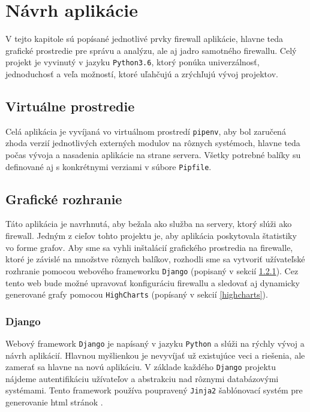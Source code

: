\chapter{Návrh aplikácie}
\label{app-design}

	V tejto kapitole sú popísané jednotlivé prvky firewall aplikácie, hlavne teda grafické prostredie 
	pre správu a analýzu, ale aj jadro samotného firewallu. Celý projekt je vyvinutý v jazyku \texttt{Python3.6},
	ktorý ponúka univerzálnosť, jednoduchosť a veľa možností, ktoré uľahčujú a zrýchľujú vývoj projektov.

	\section{Virtuálne prostredie}
	\label{pipenv}
		Celá aplikácia je vyvíjaná vo virtuálnom prostredí \texttt{pipenv}, aby bol zaručená zhoda verzií 
		jednotlivých externých modulov na rôznych systémoch, hlavne teda počas vývoja a nasadenia aplikácie
		na strane servera. Všetky potrebné balíky su definované aj s konkrétnymi verziami v súbore \texttt{Pipfile}.

	\section{Grafické rozhranie}
	\label{gui}
		Táto aplikácia je navrhnutá, aby bežala ako služba na servery, ktorý slúži ako firewall. Jedným
		z cieľov tohto projektu je, aby aplikácia poskytovala štatistiky vo forme grafov. Aby sme sa vyhli
		inštalácií grafického prostredia na firewalle, ktoré je závislé na množstve rôznych balíkov, rozhodli
		sme sa vytvoriť užívateľské rozhranie pomocou webového frameworku \texttt{Django} (popisaný v sekcií
		\ref{django}). Cez tento web bude možné upravovať konfiguráciu firewallu a sledovať aj dynamicky 
		generované grafy pomocou \texttt{HighCharts} (popísaný v sekcií \ref{highcharts}).

		\subsection{Django}
		\label{django}
			Webový framework \texttt{Django} je napísaný v jazyku \texttt{Python} a slúži na rýchly vývoj 
			a návrh aplikácií. Hlavnou myšlienkou je nevyvíjať už existujúce veci a riešenia, ale zamerať
			sa hlavne na novú aplikáciu. V základe každého \texttt{Django} projektu nájdeme autentifikáciu
			užívateľov a abstrakciu nad rôznymi databázovými systémami. Tento framework používa poupravený 
			\texttt{Jinja2} šablónovací systém pre generovanie html stránok \cite{django}.
		
